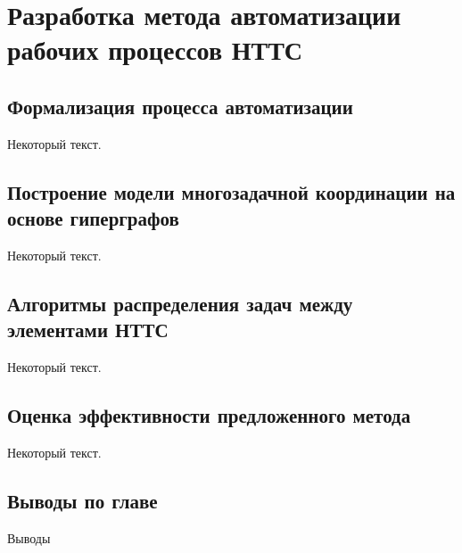 \chapter{Разработка метода автоматизации рабочих процессов НТТС}\label{ch:ch2}

\section{Формализация процесса автоматизации}\label{sec:ch2/sec1}

Некоторый текст.

\section{Построение модели многозадачной координации на основе гиперграфов}\label{sec:ch2/sec2}

Некоторый текст.

\section{Алгоритмы распределения задач между элементами НТТС}\label{sec:ch2/sec3}

Некоторый текст.

\section{Оценка эффективности предложенного метода}\label{sec:ch2/sec4}

Некоторый текст.

\section*{Выводы по главе}\label{sec:ch2/sec5}

Выводы

\FloatBarrier
